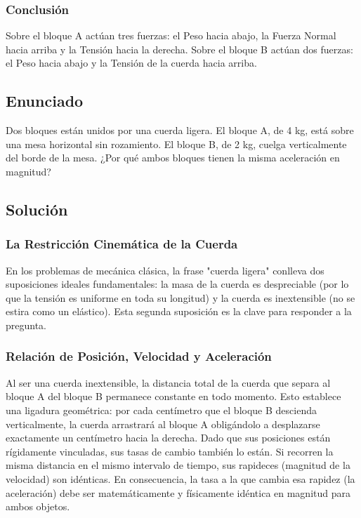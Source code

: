 \documentclass[12pt]{article}
\begin{document}
\subsubsection*{Conclusión}
Sobre el bloque A actúan tres fuerzas: el Peso hacia abajo, la Fuerza Normal hacia arriba y la Tensión hacia la derecha. Sobre el bloque B actúan dos fuerzas: el Peso hacia abajo y la Tensión de la cuerda hacia arriba.

\newpage

\subsection*{Enunciado}
Dos bloques están unidos por una cuerda ligera. El bloque A, de 4 kg, está sobre una mesa horizontal sin rozamiento. El bloque B, de 2 kg, cuelga verticalmente del borde de la mesa. ¿Por qué ambos bloques tienen la misma aceleración en magnitud?

\subsection*{Solución}

\subsubsection*{La Restricción Cinemática de la Cuerda}
En los problemas de mecánica clásica, la frase "cuerda ligera" conlleva dos suposiciones ideales fundamentales: la masa de la cuerda es despreciable (por lo que la tensión es uniforme en toda su longitud) y la cuerda es inextensible (no se estira como un elástico). Esta segunda suposición es la clave para responder a la pregunta.

\subsubsection*{Relación de Posición, Velocidad y Aceleración}
Al ser una cuerda inextensible, la distancia total de la cuerda que separa al bloque A del bloque B permanece constante en todo momento. Esto establece una ligadura geométrica: por cada centímetro que el bloque B descienda verticalmente, la cuerda arrastrará al bloque A obligándolo a desplazarse exactamente un centímetro hacia la derecha. 
Dado que sus posiciones están rígidamente vinculadas, sus tasas de cambio también lo están. Si recorren la misma distancia en el mismo intervalo de tiempo, sus rapideces (magnitud de la velocidad) son idénticas. En consecuencia, la tasa a la que cambia esa rapidez (la aceleración) debe ser matemáticamente y físicamente idéntica en magnitud para ambos objetos.
\end{document}
